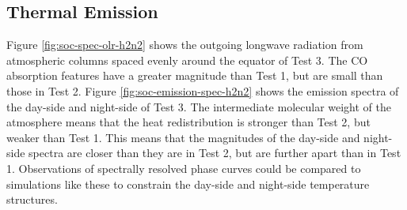 \subsection{Thermal Emission}

Figure \ref{fig:soc-spec-olr-h2n2} shows the outgoing longwave radiation from atmospheric columns spaced evenly around the equator of Test 3. The CO absorption features have a greater magnitude than Test 1, but are small than those in Test 2. Figure \ref{fig:soc-emission-spec-h2n2} shows the emission spectra of the day-side and night-side of Test 3. The intermediate molecular weight of the atmosphere means that the heat redistribution is stronger than Test 2, but weaker than Test 1. This means that the magnitudes of the day-side and night-side spectra are closer than they are in Test 2, but are further apart than in Test 1. Observations of spectrally resolved phase curves could be compared to simulations like these to constrain the day-side and night-side temperature structures.


